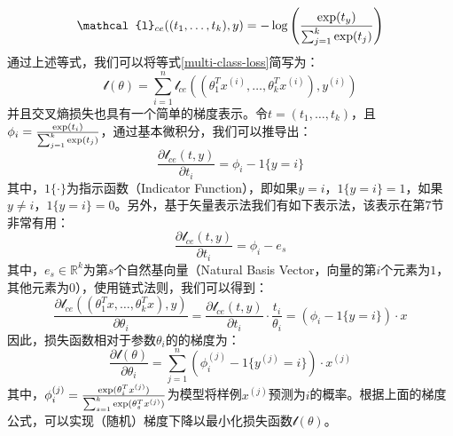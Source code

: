 \begin{equation}
  \mathcal{l}_{ce}((t_1,\ldots,t_k),y)=-\log \left( \frac{{\rm exp}(t_y)}{\sum^k_{j=1}{\rm{exp}} (t_j)} \right)
\end{equation}
通过上述等式，我们可以将等式\eqref{multi-class-loss}简写为：
\begin{equation}
  \mathcal{l}(\theta) = \sum^n_{i=1} \mathcal{l}_{ce}((\theta_1^T x^{(i)},\ldots,\theta_k^T x^{(i)}),y^{(i)})
\end{equation}
并且交叉熵损失也具有一个简单的梯度表示。令$t=(t_1,\ldots,t_k)$，且$\phi_i=\frac{{\rm exp}(t_i)}{\sum^k_{j=1}{\rm exp}(t_j)}$，通过基本微积分，我们可以推导出：
\begin{equation}
  \frac{ \partial \mathcal{l}_{ce}(t,y)}{\partial t_i}=\phi_i - 1 \{ y=i \}
\end{equation}
其中，$1\{\cdot\}$为指示函数（Indicator Function），即如果$y=i$，$1\{y=i\}=1$，如果$y \ne i$，$1\{y=i\}=0$。另外，基于矢量表示法我们有如下表示法，该表示在第7节非常有用：
\begin{equation}
  \frac{ \partial \mathcal{l}_{ce}(t,y)}{\partial t_i}=\phi_i - e_s
\end{equation}
其中，$e_s \in \mathbb{R}^k$为第$s$个自然基向量（Natural Basis Vector，向量的第$i$个元素为$1$，其他元素为$0$），使用链式法则，我们可以得到：
\begin{equation}
  \frac{\partial \mathcal{l}_{ce}((\theta_1^T x,\ldots,\theta_k^T x),y)}{\partial \theta_i}=\frac{ \partial \mathcal{l}_{ce}(t,y)}{\partial t_i} \cdot \frac{t_i}{\theta_i} = (\phi_i - 1 \{ y=i \}) \cdot x
\end{equation}
因此，损失函数相对于参数$\theta_i$的的梯度为：
\begin{equation}
  \frac{ \partial \mathcal{l}(\theta)}{\partial \theta_i} = \sum^n_{j=1} (\phi_i^{(j)} - 1 \{ y^{(j)}=i \}) \cdot x^{(j)}
\end{equation}
其中，$\phi_i^{(j)}=\frac{{\rm{exp}} (\theta_{i}^T x^{(j)})}{\sum^k_{s=1}{\rm{exp}} (\theta_s^T x^{(j)})}$为模型将样例$x^{(j)}$预测为$i$的概率。根据上面的梯度公式，可以实现（随机）梯度下降以最小化损失函数$\mathcal{l}(\theta)$。
